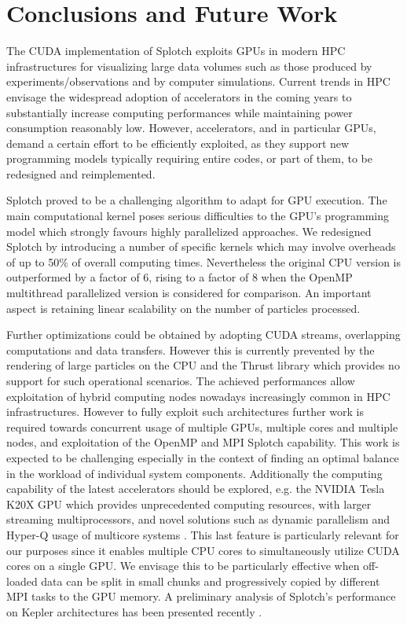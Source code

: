 \documentclass[1p]{elsarticle}
\begin{document}
\section{Conclusions and Future Work}
\label{sec:conclusions}
The CUDA implementation of Splotch exploits GPUs in modern HPC infrastructures for visualizing large data volumes such as those produced by experiments/observations and by computer simulations. Current trends in HPC envisage the widespread adoption of accelerators in the coming years to substantially increase computing performances while maintaining power consumption reasonably low. However, accelerators, and in particular GPUs, demand a certain effort to be efficiently exploited, as they support new programming models typically requiring entire codes, or part of them, to be redesigned and reimplemented. 

Splotch proved to be a challenging algorithm to adapt for GPU execution. The main computational kernel poses serious difficulties to the GPU's programming model which strongly favours highly parallelized approaches. We redesigned Splotch by introducing a number of specific kernels which may involve overheads of up to 50\% of overall computing times. Nevertheless the original CPU
version is outperformed by a factor of 6, rising to a factor of 8 when the OpenMP multithread parallelized version is considered for comparison. An important aspect is retaining linear scalability on the number of particles processed.

Further optimizations could be obtained by adopting CUDA streams, overlapping computations and data transfers. However this is currently prevented by the rendering of large particles on the CPU and the Thrust library which provides no support for such operational scenarios. The achieved performances allow exploitation of hybrid computing nodes nowadays increasingly common in HPC infrastructures. However to fully exploit such architectures further work is required towards concurrent usage of multiple GPUs, multiple cores and multiple nodes, and exploitation of the OpenMP and MPI Splotch capability. This work is expected to be challenging especially in the context of finding an optimal balance in the workload of individual system components. Additionally the computing capability of the latest accelerators should be explored, e.g. the NVIDIA Tesla K20X GPU which provides unprecedented computing resources, with larger streaming multiprocessors, and novel solutions such as dynamic parallelism and Hyper-Q usage of multicore systems \cite{GK110}. This last feature is particularly relevant for our purposes since it enables 
multiple CPU cores to simultaneously utilize CUDA cores on a single GPU. We envisage this to be particularly effective when off-loaded data can be split in small chunks and progressively copied by different MPI tasks 
to the GPU memory. A preliminary analysis of Splotch's performance on Kepler architectures has been presented recently \cite{GPUTech}. 
\end{document}
